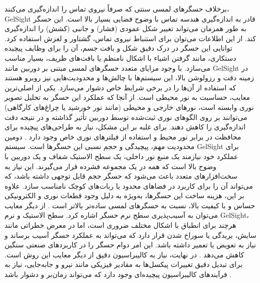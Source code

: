 برخلاف حسگرهای لمسی سنتی که صرفاً نیروی تماس را اندازه‌گیری می‌کنند، GelSight قادر به اندازه‌گیری هندسه تماس با وضوح فضایی بسیار بالا است. این حسگر به طور همزمان می‌تواند تغییر شکل عمودی (فشار) و جانبی (کشش) را اندازه‌گیری کند. از این اطلاعات می‌توان برای استنباط نیروی تماس، گشتاور و لغزش استفاده کرد. توانایی این حسگر در درک دقیق شکل و بافت جسم، آن را برای وظایف پیچیده دستکاری، مانند گرفتن اشیاء با اشکال نامنظم یا بافت‌های ظریف، بسیار مناسب می‌سازد. با وجود مزایای متعدد حسگرهای لمسی مبتنی بر دوربین مانند GelSight در زمینه دقت و رزولوشن بالا، این سیستم‌ها با چالش‌ها و محدودیت‌هایی نیز روبرو هستند که استفاده از آن‌ها را در برخی شرایط خاص دشوار می‌سازد.
یکی از اصلی‌ترین معایب، حساسیت به نور محیطی است. از آنجا که عملکرد این حسگر به تحلیل تصویر نوری وابسته است، نورهای خارجی و محیطی (مانند نور خورشید یا چراغ‌های کارگاهی) می‌توانند بر روی الگوهای نوری ثبت‌شده توسط دوربین تأثیر گذاشته و در نتیجه دقت اندازه‌گیری را کاهش دهند. برای غلبه بر این مشکل، نیاز به طراحی‌های پیچیده برای محافظت در برابر نور محیط و استفاده از فیلترهای نوری خاص وجود دارد
\cite{li2015touching}.
دومین محدودیت مهم، پیچیدگی و حجم نسبی این حسگرها است. سیستم GelSight برای عملکرد خود نیازمند یک منبع نور داخلی، یک سطح الاستیک شفاف و یک دوربین با وضوح بالا است که همه در یک مجموعه فشرده قرار می‌گیرند. این نیاز به سخت‌افزارهای متعدد باعث می‌شود که حسگر حجم قابل توجهی داشته باشد، که می‌تواند آن را برای کاربرد در فضاهای محدود یا ربات‌های کوچک نامناسب سازد. علاوه بر این، هزینه ساخت این حسگرها، به‌ویژه به دلیل وجود قطعات نوری و الکترونیکی حساس و با کیفیت بالا، نسبت به حسگرهای لمسی ساده‌تر بالاتر است
\cite{dong2021high}.
از دیگر معایب می‌توان به آسیب‌پذیری سطح نرم حسگر اشاره کرد. سطح الاستیک و نرم GelSight، هرچند برای انطباق با اشکال مختلف ضروری است، اما در معرض خطراتی مانند سایش، بریدگی یا سوراخ شدن قرار دارد که می‌تواند به عملکرد حسگر آسیب برساند و نیاز به تعویض یا تعمیر داشته باشد. این امر دوام حسگر را در کاربردهای صنعتی سنگین کاهش می‌دهد
\cite{do2022densetact}.
در نهایت، نیاز به کالیبراسیون دقیق از دیگر معایب این روش است. برای تبدیل دقیق تغییرات پیکسل‌ها به مقادیر فیزیکی مانند نیرو و جابه‌جایی، نیاز به فرآیندهای کالیبراسیون پیچیده‌ای وجود دارد که می‌تواند زمان‌بر و دشوار باشد
\cite{yuan2017gelsight}.
